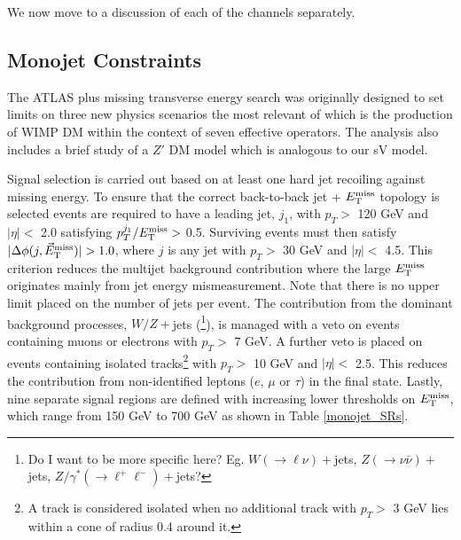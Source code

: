 \bigskip
We now move to a discussion of each of the \monoX channels separately.

\subsection{Monojet Constraints}
\label{monojet_constraints}
The ATLAS \monojet plus missing transverse energy search \cite{Aad:2015zva} was originally designed to set limits on three new physics scenarios\comm{,}
the most relevant of which is the production of WIMP DM within the context of seven  effective operators. The analysis also includes a brief study of a $Z'$ DM model which is analogous to our sV model.

Signal selection is carried out based on at least one hard jet recoiling against missing energy. To ensure that the correct back-to-back jet + $E_{\mathrm{T}}^{\mathrm{miss}}$ topology is selected events are required to have a leading jet, $j_{1}$, with $p_{T} >$ 120 GeV and $|\eta| <$ 2.0 satisfying $p_{T}^{j_{1}}/E_{\mathrm{T}}^{\mathrm{miss}} >$ 0.5. Surviving events must then satisfy $|\Delta\phi(j,\metvec)|>1.0$, where $j$ is any jet with $p_{T} >$ 30 GeV and $|\eta| <$ 4.5. This criterion reduces the multijet background contribution where the large $E_{\mathrm{T}}^{\mathrm{miss}}$ originates mainly from jet energy mismeasurement. Note that there is no upper limit placed on the number of jets per event. The contribution from the dominant background processes, $W/Z+$jets (\footnote{Do I want to be more specific here? Eg. $W (\rightarrow \ell \nu)+$jets, $Z(\rightarrow \nu\bar{\nu})+$jets, $Z/\gamma^{*}(\rightarrow \ell^{+}\ell^{-})+$jets?}), is managed with a veto on events containing muons or electrons with $p_{T}>$ 7 GeV. A further veto is placed on events containing isolated tracks\footnote{A track is considered isolated when no additional track with $p_{T} >$ 3 GeV lies within a cone of radius 0.4 around it.} with $p_{T}>$ 10 GeV and $|\eta| <$ 2.5. This reduces the contribution from non-identified leptons ($e$, $\mu$ or $\tau$) in the final state. Lastly, nine separate signal regions are defined with increasing lower thresholds on $E_{\mathrm{T}}^{\mathrm{miss}}$, which range from 150 GeV to 700 GeV as shown in Table \ref{monojet_SRs}.

